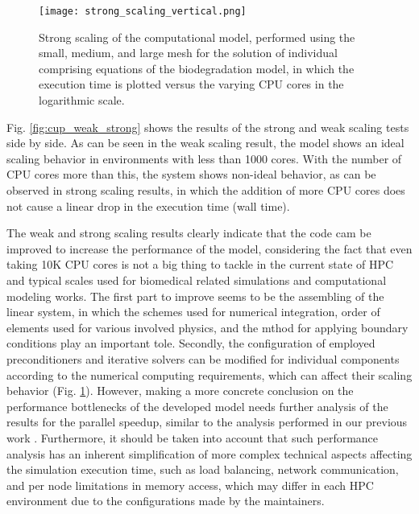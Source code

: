 \begin{figure}[h]
\centering
\medskip
\texttt{[image: strong\_scaling\_vertical.png]}
\caption[Strong scaling of individual components of the biodegradation model]{Strong scaling of the computational model, performed using the small, medium, and large mesh for the solution of individual comprising equations of the biodegradation model, in which the execution time is plotted versus the varying CPU cores in the logarithmic scale.} \label{fig:cup_strong_scaling}
\end{figure}

Fig. \ref{fig:cup_weak_strong} shows the results of the strong and weak scaling tests side by side. As can be seen in the weak scaling result, the model shows an ideal scaling behavior in environments with less than \num{1000} cores. With the number of CPU cores more than this, the system shows non-ideal behavior, as can be observed in strong scaling results, in which the addition of more CPU cores does not cause a linear drop in the execution time (wall time). 

The weak and strong scaling results clearly indicate that the code cam be improved to increase the performance of the model, considering the fact that even taking 10K CPU cores is not a big thing to tackle in the current state of HPC and typical scales used for biomedical related simulations and computational modeling works. The first part to improve seems to be the assembling of the linear system, in which the schemes used for numerical integration, order of elements used for various involved physics, and the mthod for applying boundary conditions play an important tole. Secondly, the configuration of employed preconditioners and iterative solvers can be modified for individual components according to the numerical computing requirements, which can affect their scaling behavior (Fig. \ref{fig:cup_strong_scaling}). However, making a more concrete conclusion on the performance bottlenecks of the developed model needs further analysis of the results for the parallel speedup, similar to the analysis performed in our previous work \cite{Barzegari2022}. Furthermore, it should be taken into account that such performance analysis has an inherent simplification of more complex technical aspects affecting the simulation execution time, such as load balancing, network communication, and per node limitations in memory access, which may differ in each HPC environment due to the configurations made by the maintainers.

\clearpage


